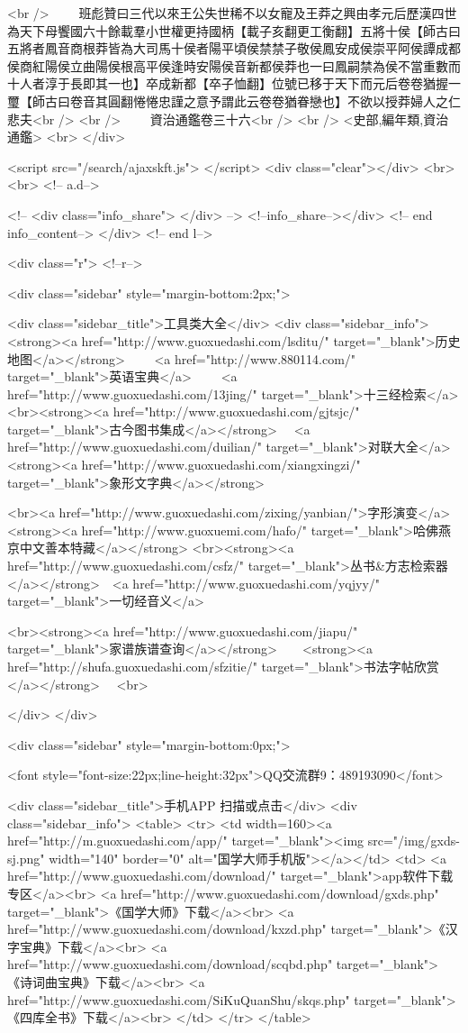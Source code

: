 <br />
　　班彪贊曰三代以來王公失世稀不以女寵及王莽之興由孝元后歷漢四世為天下母饗國六十餘載羣小世權更持國柄【載子亥翻更工衡翻】五將十侯【師古曰五將者鳳音商根莽皆為大司馬十侯者陽平頃侯禁禁子敬侯鳳安成侯崇平阿侯譚成都侯商紅陽侯立曲陽侯根高平侯逢時安陽侯音新都侯莽也一曰鳳嗣禁為侯不當重數而十人者淳于長即其一也】卒成新都【卒子恤翻】位號已移于天下而元后卷卷猶握一璽【師古曰卷音其圓翻惓惓忠謹之意予謂此云卷卷猶眷戀也】不欲以授莽婦人之仁悲夫<br />
<br />
　　資治通鑑卷三十六<br />
<br />
<史部,編年類,資治通鑑>  <br>
   </div> 

<script src="/search/ajaxskft.js"> </script>
 <div class="clear"></div>
<br>
<br>
 <!-- a.d-->

 <!--
<div class="info_share">
</div> 
-->
 <!--info_share--></div>   <!-- end info_content-->
  </div> <!-- end l-->

<div class="r">   <!--r-->



<div class="sidebar"  style="margin-bottom:2px;">

 
<div class="sidebar_title">工具类大全</div>
<div class="sidebar_info">
<strong><a href="http://www.guoxuedashi.com/lsditu/" target="_blank">历史地图</a></strong>　　
<a href="http://www.880114.com/" target="_blank">英语宝典</a>　　
<a href="http://www.guoxuedashi.com/13jing/" target="_blank">十三经检索</a>　
<br><strong><a href="http://www.guoxuedashi.com/gjtsjc/" target="_blank">古今图书集成</a></strong>　
<a href="http://www.guoxuedashi.com/duilian/" target="_blank">对联大全</a>　<strong><a href="http://www.guoxuedashi.com/xiangxingzi/" target="_blank">象形文字典</a></strong>　

<br><a href="http://www.guoxuedashi.com/zixing/yanbian/">字形演变</a>　　<strong><a href="http://www.guoxuemi.com/hafo/" target="_blank">哈佛燕京中文善本特藏</a></strong>
<br><strong><a href="http://www.guoxuedashi.com/csfz/" target="_blank">丛书&方志检索器</a></strong>　<a href="http://www.guoxuedashi.com/yqjyy/" target="_blank">一切经音义</a>　　

<br><strong><a href="http://www.guoxuedashi.com/jiapu/" target="_blank">家谱族谱查询</a></strong>　　<strong><a href="http://shufa.guoxuedashi.com/sfzitie/" target="_blank">书法字帖欣赏</a></strong>　
<br>

</div>
</div>


<div class="sidebar" style="margin-bottom:0px;">

<font style="font-size:22px;line-height:32px">QQ交流群9：489193090</font>


<div class="sidebar_title">手机APP 扫描或点击</div>
<div class="sidebar_info">
<table>
<tr>
	<td width=160><a href="http://m.guoxuedashi.com/app/" target="_blank"><img src="/img/gxds-sj.png" width="140"  border="0" alt="国学大师手机版"></a></td>
	<td>
<a href="http://www.guoxuedashi.com/download/" target="_blank">app软件下载专区</a><br>
<a href="http://www.guoxuedashi.com/download/gxds.php" target="_blank">《国学大师》下载</a><br>
<a href="http://www.guoxuedashi.com/download/kxzd.php" target="_blank">《汉字宝典》下载</a><br>
<a href="http://www.guoxuedashi.com/download/scqbd.php" target="_blank">《诗词曲宝典》下载</a><br>
<a href="http://www.guoxuedashi.com/SiKuQuanShu/skqs.php" target="_blank">《四库全书》下载</a><br>
</td>
</tr>
</table>

